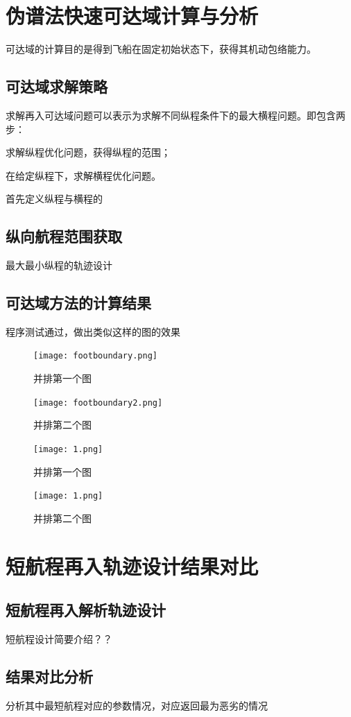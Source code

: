 \section{伪谱法快速可达域计算与分析}

可达域的计算目的是得到飞船在固定初始状态下，获得其机动包络能力。
\subsection{可达域求解策略}
求解再入可达域问题可以表示为求解不同纵程条件下的最大横程问题。即包含两步：
\begin{compactenum}
	\item 求解纵程优化问题，获得纵程的范围；
	\item 在给定纵程下，求解横程优化问题。
\end{compactenum}

首先定义纵程与横程的


\subsection{纵向航程范围获取}
最大最小纵程的轨迹设计

\subsection{可达域方法的计算结果}
程序测试通过，做出类似这样的图的效果
\begin{figure}[htb]
	\begin{minipage}{0.48\textwidth}
		\centering
		\texttt{[image: footboundary.png]}
		\caption{并排第一个图}
		\label{fig:parallel1}
	\end{minipage}\hfill
	\begin{minipage}{0.48\textwidth}
		\centering
		\texttt{[image: footboundary2.png]}
		\caption{并排第二个图}
		\label{fig:parallel2}
	\end{minipage}
\end{figure}

\begin{figure}[htb]
	\begin{minipage}{0.48\textwidth}
		\centering
		\texttt{[image: 1.png]}
		\caption{并排第一个图}
		\label{fig:parallel1}
	\end{minipage}\hfill
	\begin{minipage}{0.48\textwidth}
		\centering
		\texttt{[image: 1.png]}
		\caption{并排第二个图}
		\label{fig:parallel2}
	\end{minipage}
\end{figure}

\section{短航程再入轨迹设计结果对比}
\subsection{短航程再入解析轨迹设计}
短航程设计简要介绍？？
\subsection{结果对比分析}
分析其中最短航程对应的参数情况，对应返回最为恶劣的情况
